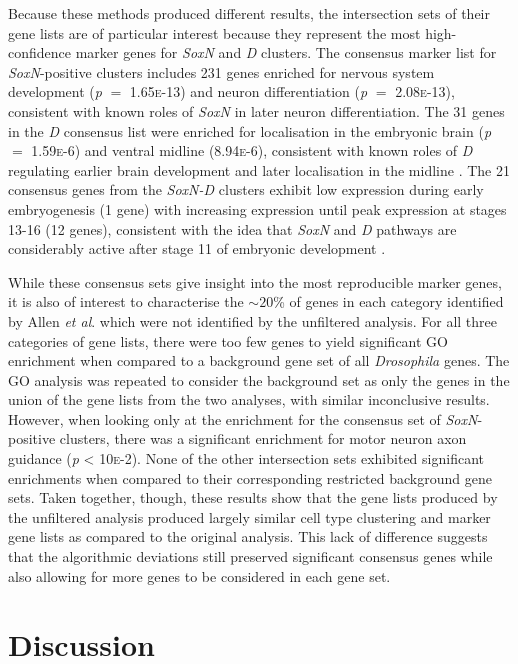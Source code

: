 \documentclass[withindex,glossary]{cam-thesis}
\begin{document}
Because these methods produced different results, the intersection sets of their gene lists are of particular interest because they represent the most high-confidence marker genes for \emph{SoxN} and \emph{D} clusters. The consensus marker list for \emph{SoxN}-positive clusters includes 231 genes enriched for nervous system development (\emph{p} $=$ 1.65\textsc{e}-13) and neuron differentiation (\emph{p} $=$ 2.08\textsc{e}-13), consistent with known roles of \emph{SoxN} in later neuron differentiation. The 31 genes in the \emph{D} consensus list were enriched for localisation in the embryonic brain (\emph{p} $=$ 1.59\textsc{e}-6) and ventral midline (8.94\textsc{e}-6), consistent with known roles of \emph{D} regulating earlier brain development and later localisation in the midline . The 21 consensus genes from the \emph{SoxN-D} clusters exhibit low expression during early embryogenesis (1 gene) with increasing expression until peak expression at stages 13-16 (12 genes), consistent with the idea that \emph{SoxN} and \emph{D} pathways are considerably active after stage 11 of embryonic development .

While these consensus sets give insight into the most reproducible marker genes, it is also of interest to characterise the $\sim{}20$\% of genes in each category identified by Allen \emph{et al}. which were not identified by the unfiltered analysis. For all three categories of gene lists, there were too few genes to yield significant GO enrichment when compared to a background gene set of all \emph{Drosophila} genes. The GO analysis was repeated to consider the background set as only the genes in the union of the gene lists from the two analyses, with similar inconclusive results. However, when looking only at the enrichment for the consensus set of \emph{SoxN}-positive clusters, there was a significant enrichment for motor neuron axon guidance (\emph{p} \textless{} 10\textsc{e}-2). None of the other intersection sets exhibited significant enrichments when compared to their corresponding restricted background gene sets. Taken together, though, these results show that the gene lists produced by the unfiltered analysis produced largely similar cell type clustering and marker gene lists as compared to the original analysis. This lack of difference suggests that the algorithmic deviations still preserved significant consensus genes while also allowing for more genes to be considered in each gene set.

\section{Discussion}
\end{document}
